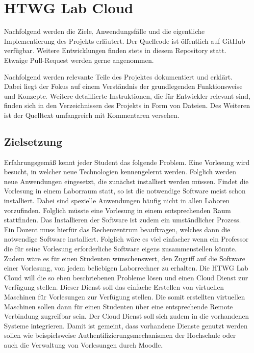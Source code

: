 \chapter{HTWG Lab Cloud}

Nachfolgend werden die Ziele, Anwendungsfälle und die eigentliche Implementierung des Projekts erläutert.
Der Quellcode ist öffentlich auf GitHub \cite{git-source} verfügbar. Weitere Entwicklungen finden stets in diesem Repository statt. Etwaige Pull-Request werden gerne angenommen.

Nachfolgend werden relevante Teile des Projektes dokumentiert und erklärt. Dabei liegt der Fokus auf einem Verständnis der grundlegenden Funktionsweise und Konzepte. Weitere detaillierte Instruktionen, die für Entwickler relevant sind, finden sich in den Verzeichnissen des Projekts in Form von  Dateien. Des Weiteren ist der Quelltext umfangreich mit Kommentaren versehen.

\section{Zielsetzung}
Erfahrungsgemäß kennt jeder Student das folgende Problem. Eine Vorlesung wird
besucht, in welcher neue Technologien kennengelernt werden. Folglich werden neue Anwendungen
eingesetzt, die zunächst installiert werden müssen. 
Findet die Vorlesung in einem Laborraum statt, 
so ist die notwendige Software meist schon installiert.
Dabei sind spezielle Anwendungen häufig nicht in allen Laboren vorzufinden. Folglich müsste
eine Vorlesung in einem entsprechenden Raum stattfinden.
Das Installieren der Software ist zudem ein umständlicher Prozess. Ein Dozent muss hierfür
das Rechenzentrum beauftragen, welches dann die notwendige Software installiert.
Folglich wäre es viel einfacher wenn ein Professor die für seine Vorlesung erforderliche Software
eigens zusammenstellen könnte.
Zudem wäre es für einen Studenten wünschenswert, den Zugriff auf die Software einer Vorlesung,
von jedem beliebigen Laborrechner zu erhalten.
Die HTWG Lab Cloud will die so eben beschriebenen Probleme lösen und einen Cloud Dienst zur
Verfügung stellen. Dieser Dienst soll das einfache Erstellen von virtuellen Maschinen für
Vorlesungen zur Verfügung stellen. Die somit erstellten virtuellen Maschinen sollen dann für
einen Studenten über eine entsprechende Remote Verbindung zugreifbar sein. Der Cloud Dienst soll
sich zudem in die vorhandenen Systeme integrieren. Damit ist gemeint, dass vorhandene
Dienste genutzt werden sollen wie beispielsweise Authentifizierungsmechanismen der Hochschule
oder auch die Verwaltung von Vorlesungen durch Moodle.

